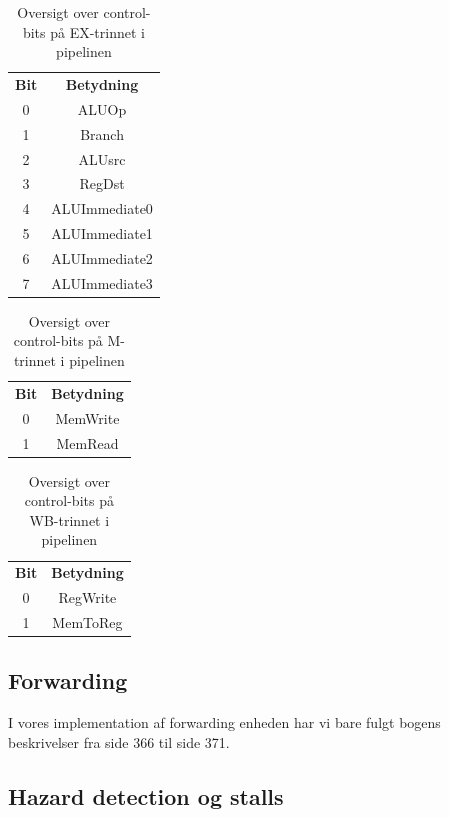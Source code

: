 \documentclass [10pt,a4paper]{article}
\begin{document}
\begin{table}
  \centering
  \begin{tabular}{ c | c }
    \textbf{Bit} & \textbf{Betydning} \\
    0 & ALUOp \\
    1 & Branch \\
    2 & ALUsrc \\
    3 & RegDst \\
    4 & ALUImmediate0 \\
    5 & ALUImmediate1 \\
    6 & ALUImmediate2 \\
    7 & ALUImmediate3 \\
  \end{tabular}
  \caption{Oversigt over control-bits på EX-trinnet i pipelinen}
\end{table}

\begin{table}
  \centering
  \begin{tabular}{ c | c }
    \textbf{Bit} & \textbf{Betydning} \\
    0 & MemWrite \\
    1 & MemRead \\
  \end{tabular}
  \caption{Oversigt over control-bits på M-trinnet i pipelinen}
\end{table}

\begin{table}
  \centering
  \begin{tabular}{ c | c }
    \textbf{Bit} & \textbf{Betydning} \\
    0 & RegWrite \\
    1 & MemToReg \\
  \end{tabular}
  \caption{Oversigt over control-bits på WB-trinnet i pipelinen}
\end{table}

\subsection{Forwarding}

I vores implementation af forwarding enheden har vi bare fulgt bogens
beskrivelser fra side 366 til side 371. 

\subsection{Hazard detection og stalls}
\end{document}
